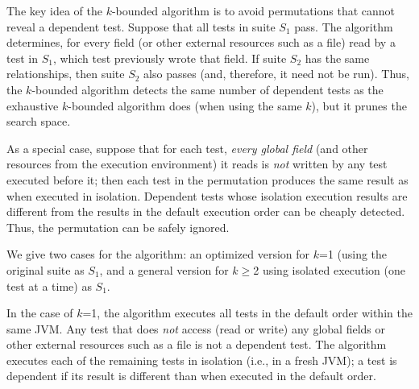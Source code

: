 The key idea of the \dependenceaware{} $k$-bounded algorithm
is to avoid permutations that cannot reveal a dependent test.
Suppose that all tests in suite $S_1$ pass.  The algorithm determines, for
every field (or other external resources such as a file)
read by a test in $S_1$, which test previously wrote that field.
If suite $S_2$ has the same relationships, then suite $S_2$ also passes
(and, therefore, it need not be run).
Thus, the \dependenceaware{} $k$-bounded algorithm
detects the same number of dependent tests
as the exhaustive $k$-bounded algorithm does (when using the same $k$),
but it prunes the search space.



As a special case, suppose that for each test,
\textit{every global field} (and other 
resources from the execution environment) it reads
is \textit{not} written by any test executed before it; then
each test in the permutation produces
the same result as when executed in isolation.
Dependent tests whose isolation execution results
are different from the results in the default execution order
can be cheaply detected.
Thus, the permutation can be safely ignored. 

We give two cases for the algorithm:  an optimized version for $k$=1 (using
the original suite as $S_1$, and
a general version for $k$$\ge$2 using isolated
execution (one test at a time) as $S_1$.

In the case of $k$=1, the algorithm executes all tests in the default order
within the same JVM\@.  Any test that does \textit{not}
access (read or write) any global fields or
other external resources such as a file
is not a dependent test. 
The algorithm executes each of the remaining tests in isolation (i.e., in a
fresh JVM); a test is dependent if its result is different than when
executed in the default order.

